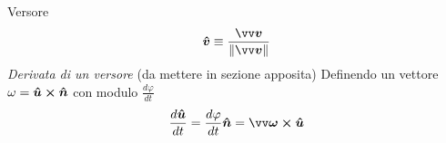 Versore 
\[
     \v{v} \equiv \frac{\vec{v}}{\Norm{v}}
\]
\emph{Derivata di un versore} (da mettere in sezione apposita)
Definendo un vettore $\omega = \boldsymbol{\hat{u}} \cross \boldsymbol{\hat{n}}$ con modulo $\frac{d \varphi}{dt}$
\[
 \frac{d\v{u}}{dt} = \frac{d \varphi}{dt} \v{n} = \vec{\omega} \cross \v{u}     
\]